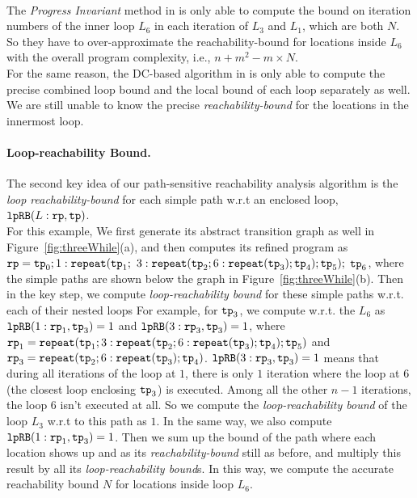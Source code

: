 \\
The \emph{Progress Invariant} method in \cite{GulwaniJK09} is only able to compute
the
bound on iteration numbers
of the inner loop $L_6$ in each iteration of $L_3$ and $L_1$, which are both $N$.
So they have to over-approximate the reachability-bound for locations inside $L_6$ with the
overall program complexity, i.e., $n + m^2 - m \times N$.
\\
For the same reason, the DC-based algorithm in \cite{sinn2017complexity}
is only able to
compute the precise combined loop bound and the local bound of each loop
separately as well.
We are still unable to know the precise \emph{reachability-bound} for the locations in the innermost loop.
\paragraph*{Loop-reachability Bound.}
The second key idea of our path-sensitive reachability analysis algorithm is the
\emph{loop reachability-bound} for each simple path w.r.t an enclosed loop,
${\mathtt{lpRB}}(L:{\mathtt{rp}}, {\mathtt{tp}})$.
%
\\
For this example, We first generate its abstract transition graph as well in Figure~\ref{fig:threeWhile}(a),
and then computes its refined program as 
${\mathtt{rp}} = {\mathtt{tp}}_0; 1: {\mathtt{repeat}}({\mathtt{tp}}_1;$ 
$3: {{\mathtt{repeat}}({\mathtt{tp}}_2; 6 : {{\mathtt{repeat}}({\mathtt{tp}}_3)}; {\mathtt{tp}}_4)}; {\mathtt{tp}}_5);$ 
${\mathtt{tp}}_6$,
where the simple paths are shown below the graph in Figure~\ref{fig:threeWhile}(b).
Then in the key step, we compute \emph{loop-reachability bound} for these simple paths w.r.t. each of their nested loops
For example, for ${\mathtt{tp}}_3$, we compute
w.r.t. the $L_6$ as
${\mathtt{lpRB}}(1: {\mathtt{rp}}_1, {\mathtt{tp}}_3) = 1$ and
${\mathtt{lpRB}}(3: {\mathtt{rp}}_3, {\mathtt{tp}}_3) = 1$,
where 
${\mathtt{rp}}_1 = {{\mathtt{repeat}}({\mathtt{tp}}_1; 3: {{\mathtt{repeat}}({\mathtt{tp}}_2; 6 : {{\mathtt{repeat}}({\mathtt{tp}}_3)}; {\mathtt{tp}}_4)}; {\mathtt{tp}}_5)}$
and
${\mathtt{rp}}_3 = {{\mathtt{repeat}}({\mathtt{tp}}_2; 6 : {{\mathtt{repeat}}({\mathtt{tp}}_3)}; {\mathtt{tp}}_4)}$.
${\mathtt{lpRB}}(3: {\mathtt{rp}}_3, {\mathtt{tp}}_3) = 1$
means that during all iterations of the loop at $1$, there is only $1$ iteration where the loop at $6$
(the closest loop enclosing ${\mathtt{tp}}_3$) is executed.
Among all the other $n - 1$ iterations, the loop $6$ isn't executed at all.
So we compute the \emph{loop-reachability bound}  of the loop $L_3$
w.r.t to this path as $1$.
In the same way, we also compute ${\mathtt{lpRB}}(1: {\mathtt{rp}}_1, {\mathtt{tp}}_3) = 1$.
Then we sum up the bound of the path where each location shows up
and as its \emph{reachability-bound} still as before,
and multiply this result by all its \emph{loop-reachability bound}s.
In this way, we compute the accurate reachability bound $N$ for locations inside loop $L_6$.

